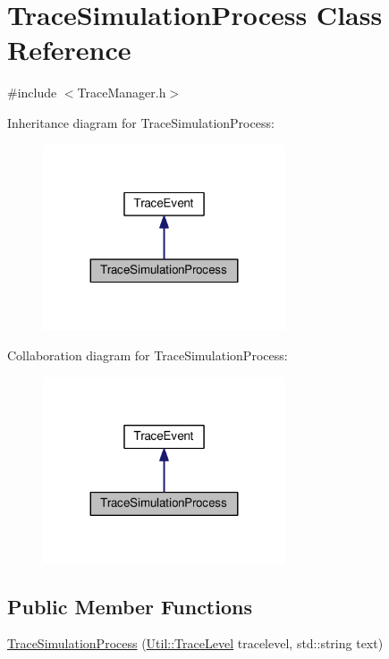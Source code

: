 \hypertarget{class_trace_simulation_process}{}\section{Trace\+Simulation\+Process Class Reference}
\label{class_trace_simulation_process}


{\ttfamily \#include $<$Trace\+Manager.\+h$>$}



Inheritance diagram for Trace\+Simulation\+Process\+:
\nopagebreak
\begin{figure}[H]
\begin{center}
\leavevmode
\includegraphics[width=203pt]{class_trace_simulation_process__inherit__graph}
\end{center}
\end{figure}


Collaboration diagram for Trace\+Simulation\+Process\+:
\nopagebreak
\begin{figure}[H]
\begin{center}
\leavevmode
\includegraphics[width=203pt]{class_trace_simulation_process__coll__graph}
\end{center}
\end{figure}
\subsection*{Public Member Functions}
\begin{DoxyCompactItemize}
\item 
\hyperlink{class_trace_simulation_process_a20762e9f477719c87c135896e345f4a6}{Trace\+Simulation\+Process} (\hyperlink{class_util_a0a3482cfa2d915e261c0cf528fdc7afc}{Util\+::\+Trace\+Level} tracelevel, std\+::string text)
\end{DoxyCompactItemize}


